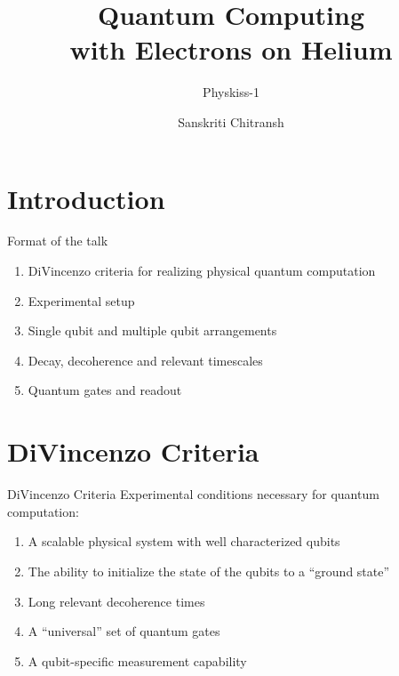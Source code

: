 \documentclass{beamer}
\title{Quantum Computing \\ with Electrons on Helium}
\subtitle{\vspace*{5mm}\large{Physkiss-1}}
\author{\vspace*{-1cm}Sanskriti Chitransh}
\date{\vskip\small{3rd June, 2020}}
\begin{document}

\maketitle

\section{Introduction}
\begin{frame}[t]{Format of the talk}
    \begin{enumerate}
        \item DiVincenzo criteria for realizing physical quantum computation
        \item Experimental setup
        \item Single qubit and multiple qubit arrangements
        \item Decay, decoherence and relevant timescales
        \item Quantum gates and readout
    \end{enumerate}
\end{frame}

\section{DiVincenzo Criteria}
\begin{frame}[t]{DiVincenzo Criteria}
    Experimental conditions necessary for quantum computation:
    \begin{enumerate}
       \item A scalable physical system with well characterized qubits
        \item The ability to initialize the state of the qubits to a “ground state”
        \item Long relevant decoherence times
        \item A “universal” set of quantum gates
        \item  A qubit-specific measurement capability
    \end{enumerate}
\end{frame}
\end{document}
